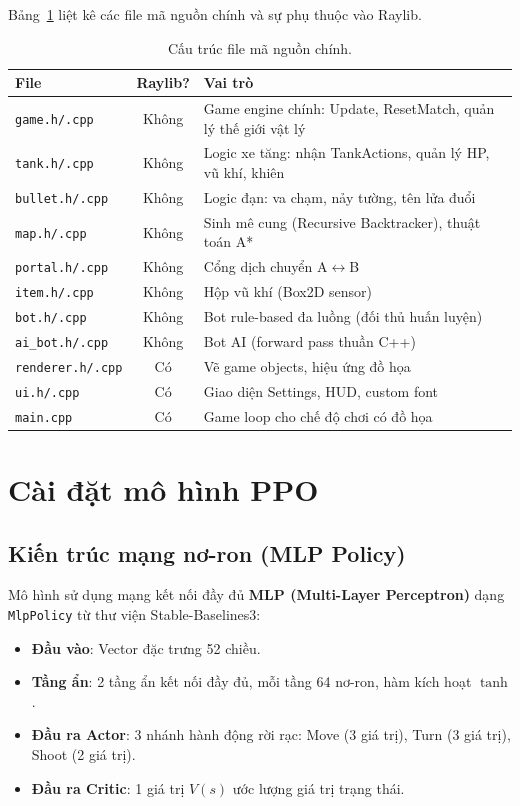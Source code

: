 \documentclass[a4paper, 12pt]{report}
\begin{document}
  Bảng~\ref{tab:files} liệt kê các file mã nguồn chính và sự phụ thuộc vào Raylib.

  \begin{table}[H]
  \centering
  \caption{Cấu trúc file mã nguồn chính.}
  \label{tab:files}
  \renewcommand{\arraystretch}{1.2}
  \begin{tabular}{l c p{8cm}}
    \toprule
    \textbf{File} & \textbf{Raylib?} & \textbf{Vai trò} \\
    \midrule
    \texttt{game.h/.cpp}     & Không & Game engine chính: Update, ResetMatch, quản lý thế giới vật lý \\
    \texttt{tank.h/.cpp}     & Không & Logic xe tăng: nhận TankActions, quản lý HP, vũ khí, khiên \\
    \texttt{bullet.h/.cpp}   & Không & Logic đạn: va chạm, nảy tường, tên lửa đuổi \\
    \texttt{map.h/.cpp}      & Không & Sinh mê cung (Recursive Backtracker), thuật toán A* \\
    \texttt{portal.h/.cpp}   & Không & Cổng dịch chuyển A$\leftrightarrow$B \\
    \texttt{item.h/.cpp}     & Không & Hộp vũ khí (Box2D sensor) \\
    \texttt{bot.h/.cpp}      & Không & Bot rule-based đa luồng (đối thủ huấn luyện) \\
    \texttt{ai\_bot.h/.cpp}  & Không & Bot AI (forward pass thuần C++) \\
    \midrule
    \texttt{renderer.h/.cpp} & Có & Vẽ game objects, hiệu ứng đồ họa \\
    \texttt{ui.h/.cpp}       & Có & Giao diện Settings, HUD, custom font \\
    \texttt{main.cpp}        & Có & Game loop cho chế độ chơi có đồ họa \\
    \bottomrule
  \end{tabular}
  \end{table}

  \section{Cài đặt mô hình PPO}

  \subsection{Kiến trúc mạng nơ-ron (MLP Policy)}

  Mô hình sử dụng mạng kết nối đầy đủ \textbf{MLP (Multi-Layer Perceptron)} dạng \texttt{MlpPolicy} từ thư viện Stable-Baselines3:
  \begin{itemize}
    \item \textbf{Đầu vào}: Vector đặc trưng 52 chiều.
    \item \textbf{Tầng ẩn}: 2 tầng ẩn kết nối đầy đủ, mỗi tầng 64 nơ-ron, hàm kích hoạt $\tanh$.
    \item \textbf{Đầu ra Actor}: 3 nhánh hành động rời rạc: Move (3 giá trị), Turn (3 giá trị), Shoot (2 giá trị).
    \item \textbf{Đầu ra Critic}: 1 giá trị $V(s)$ ước lượng giá trị trạng thái.
  \end{itemize}
\end{document}

